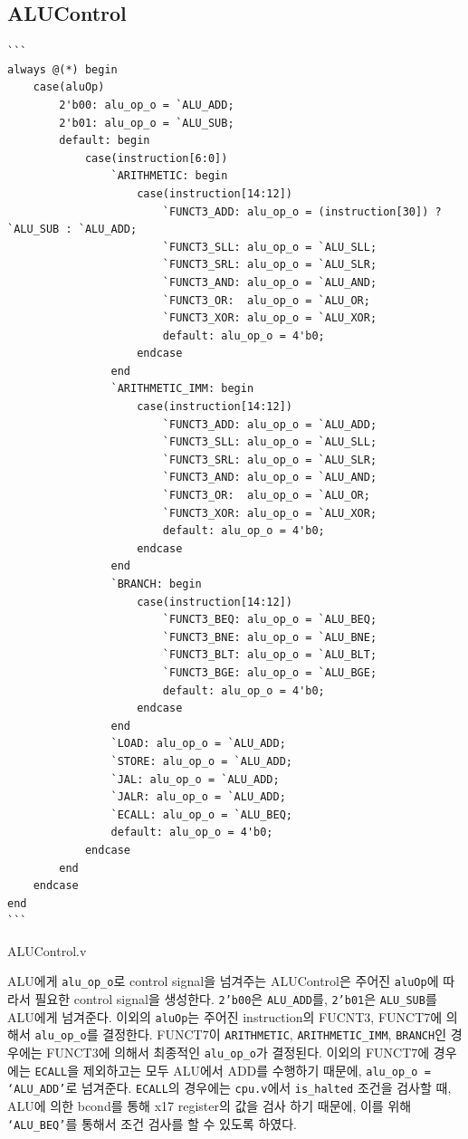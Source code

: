 \documentclass[openright, a4paper]{article}
\newenvironment{longlisting}{\captionsetup{type=listing}}{}
\newcommand{\code}[1]{\texttt{#1}}
\begin{document}
\subsection{ALUControl}
\begin{longlisting}
    \begin{verbatim}
```
always @(*) begin
    case(aluOp)
        2'b00: alu_op_o = `ALU_ADD;
        2'b01: alu_op_o = `ALU_SUB;
        default: begin
            case(instruction[6:0])
                `ARITHMETIC: begin
                    case(instruction[14:12])
                        `FUNCT3_ADD: alu_op_o = (instruction[30]) ? `ALU_SUB : `ALU_ADD;
                        `FUNCT3_SLL: alu_op_o = `ALU_SLL;
                        `FUNCT3_SRL: alu_op_o = `ALU_SLR;
                        `FUNCT3_AND: alu_op_o = `ALU_AND;
                        `FUNCT3_OR:  alu_op_o = `ALU_OR;
                        `FUNCT3_XOR: alu_op_o = `ALU_XOR;
                        default: alu_op_o = 4'b0;
                    endcase
                end
                `ARITHMETIC_IMM: begin
                    case(instruction[14:12])
                        `FUNCT3_ADD: alu_op_o = `ALU_ADD;
                        `FUNCT3_SLL: alu_op_o = `ALU_SLL;
                        `FUNCT3_SRL: alu_op_o = `ALU_SLR;
                        `FUNCT3_AND: alu_op_o = `ALU_AND;
                        `FUNCT3_OR:  alu_op_o = `ALU_OR;
                        `FUNCT3_XOR: alu_op_o = `ALU_XOR;
                        default: alu_op_o = 4'b0;
                    endcase
                end
                `BRANCH: begin
                    case(instruction[14:12])
                        `FUNCT3_BEQ: alu_op_o = `ALU_BEQ;
                        `FUNCT3_BNE: alu_op_o = `ALU_BNE;
                        `FUNCT3_BLT: alu_op_o = `ALU_BLT;
                        `FUNCT3_BGE: alu_op_o = `ALU_BGE;
                        default: alu_op_o = 4'b0;
                    endcase
                end
                `LOAD: alu_op_o = `ALU_ADD;
                `STORE: alu_op_o = `ALU_ADD;
                `JAL: alu_op_o = `ALU_ADD;
                `JALR: alu_op_o = `ALU_ADD;
                `ECALL: alu_op_o = `ALU_BEQ;
                default: alu_op_o = 4'b0;
            endcase
        end
    endcase
end
```
    \end{verbatim}
    \caption{ALUControl.v}
\end{longlisting}

ALU에게 \code{alu_op_o}로 control signal을 넘겨주는 ALUControl은 주어진 \code{aluOp}에 따라서 필요한 control signal을 생성한다.
\code{2'b00}은 \code{ALU_ADD}를, \code{2'b01}은 \code{ALU_SUB}를 ALU에게 넘겨준다.
이외의 \code{aluOp}는 주어진 instruction의 FUCNT3, FUNCT7에 의해서 \code{alu_op_o}를 결정한다.
FUNCT7이 \code{ARITHMETIC}, \code{ARITHMETIC_IMM}, \code{BRANCH}인 경우에는 FUNCT3에 의해서 최종적인 \code{alu_op_o}가 결정된다.
이외의 FUNCT7에 경우에는 \code{ECALL}을 제외하고는 모두 ALU에서 ADD를 수행하기 때문에, \code{alu_op_o = `ALU_ADD'}로 넘겨준다.
\code{ECALL}의 경우에는 \code{cpu.v}에서 \code{is_halted} 조건을 검사할 때, ALU에 의한 bcond를 통해 x17 register의 값을 검사 하기 때문에, 이를 위해 \code{`ALU_BEQ'}를 통해서 조건 검사를 할 수 있도록 하였다.
\end{document}
